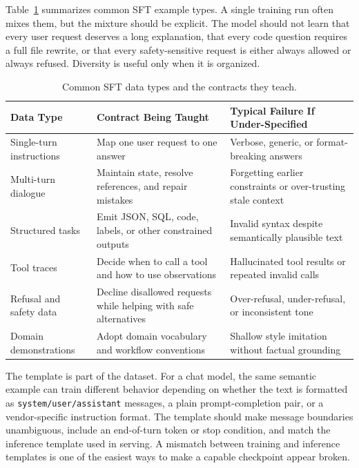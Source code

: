 Table~\ref{tab:sft-data-types} summarizes common SFT example types. A single training run often mixes them, but the mixture should be explicit. The model should not learn that every user request deserves a long explanation, that every code question requires a full file rewrite, or that every safety-sensitive request is either always allowed or always refused. Diversity is useful only when it is organized.

\begin{table}[t]
\caption{Common SFT data types and the contracts they teach.}
\label{tab:sft-data-types}
\small
\begin{tabular}{@{}p{2.4cm}p{4.1cm}p{4.2cm}@{}}
\toprule
Data Type & Contract Being Taught & Typical Failure If Under-Specified \\
\midrule
Single-turn instructions & Map one user request to one answer & Verbose, generic, or format-breaking answers \\
Multi-turn dialogue & Maintain state, resolve references, and repair mistakes & Forgetting earlier constraints or over-trusting stale context \\
Structured tasks & Emit JSON, SQL, code, labels, or other constrained outputs & Invalid syntax despite semantically plausible text \\
Tool traces & Decide when to call a tool and how to use observations & Hallucinated tool results or repeated invalid calls \\
Refusal and safety data & Decline disallowed requests while helping with safe alternatives & Over-refusal, under-refusal, or inconsistent tone \\
Domain demonstrations & Adopt domain vocabulary and workflow conventions & Shallow style imitation without factual grounding \\
\bottomrule
\end{tabular}
\end{table}

The template is part of the dataset. For a chat model, the same semantic example can train different behavior depending on whether the text is formatted as \texttt{system/user/assistant} messages, a plain prompt-completion pair, or a vendor-specific instruction format. The template should make message boundaries unambiguous, include an end-of-turn token or stop condition, and match the inference template used in serving. A mismatch between training and inference templates is one of the easiest ways to make a capable checkpoint appear broken.

